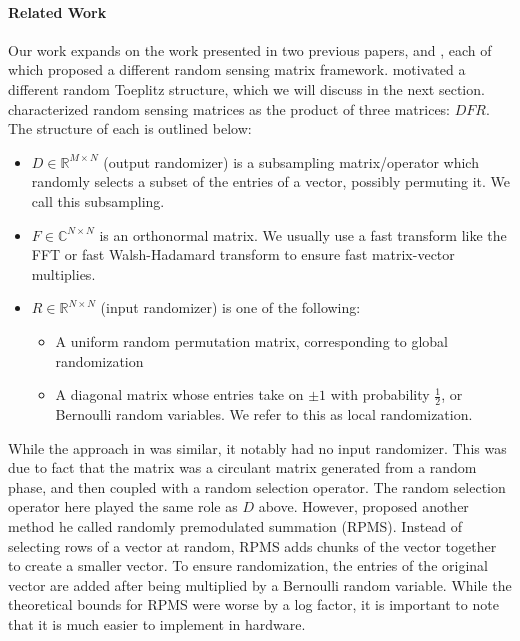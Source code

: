 \paragraph{Related Work}
Our work expands on the work presented in two previous papers, \cite{doetal} and \cite{romberg2009}, each of which proposed a different random sensing matrix framework. \cite{wotao} motivated a different random Toeplitz structure, which we will discuss in the next section. \cite{doetal} characterized random sensing matrices as the product of three matrices: $DFR$. The structure of each is outlined below:

\begin{itemize}
	\item $D\in \mathbb{R}^{M\times N}$ (output randomizer) is a subsampling matrix/operator which randomly selects a subset of the entries of a vector, possibly permuting it. We call this subsampling.
	\item $F\in\mathbb{C}^{N\times N}$ is an orthonormal matrix. We usually use a fast transform like the FFT or fast Walsh-Hadamard transform to ensure fast matrix-vector multiplies.
	\item $R\in\mathbb{R}^{N\times N}$ (input randomizer) is one of the following:
		\begin{itemize}
			\item A uniform random permutation matrix, corresponding to global randomization
			\item A diagonal matrix whose entries take on $\pm 1$ with probability $\tfrac{1}{2}$, or Bernoulli random variables. We refer to this as local randomization.
		\end{itemize}
\end{itemize}

While the approach in \cite{romberg2009} was similar, it notably had no input randomizer. This was due to fact that the matrix was a circulant matrix generated from a random phase, and then coupled with a random selection operator. The random selection operator here played the same role as $D$ above. However, \cite{romberg2009} proposed another method he called randomly premodulated summation (RPMS). Instead of selecting rows of a vector at random, RPMS adds chunks of the vector together to create a smaller vector. To ensure randomization, the entries of the original vector are added after being multiplied by a Bernoulli random variable. While the theoretical bounds for RPMS were worse by a log factor, it is important to note that it is much easier to implement in hardware.

